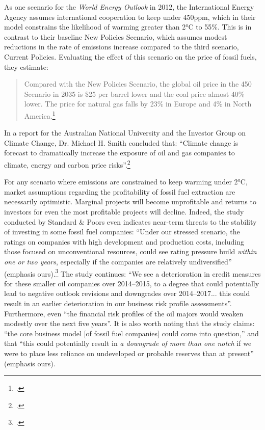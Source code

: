 As one scenario for the \emph{World Energy Outlook} in 2012, the International Energy Agency assumes international cooperation to keep  under 450ppm, which in their model constrains the likelihood of warming greater than 2°C to 55\%. 
This is in contrast to their baseline New Policies Scenario, which assumes modest reductions in the rate of emissions increase compared to the third scenario, Current Policies. 
Evaluating the effect of this scenario on the price of fossil fuels, they estimate:
\begin{quote}
Compared with the New Policies Scenario, the global oil price in the 450 Scenario in 2035 is \$25 per barrel lower and the coal price almost 40\% lower. The price for natural gas falls by 23\% in Europe and 4\% in North America.\footcite[][p. 257]{IEA2012}
\end{quote}
In a report for the Australian National University and the Investor Group on Climate Change, Dr. Michael H. Smith concluded that: ``Climate change is forecast to dramatically increase the exposure of oil and gas companies to climate, energy and carbon price risks''.\footcite[][p. 14]{RisksForInvestors}



For any scenario where emissions are constrained to keep warming under 2°C, market assumptions regarding the profitability of fossil fuel extraction are necessarily optimistic. 
Marginal projects will become unprofitable and returns to investors for even the most profitable projects will decline. 
Indeed, the study conducted by Standard \& Poors even indicates near-term threats to the stability of investing in some fossil fuel companies: ``Under our stressed scenario, the ratings on companies with high development and production costs, including those focused on unconventional resources, could see rating pressure build \emph{within one or two years}, especially if the companies are relatively undiversified'' (emphasis ours).\footcite{SandPConstrained}
The study continues: ``We see a deterioration in credit measures for these smaller oil companies over 2014--2015, to a degree that could potentially lead to negative outlook revisions and downgrades over 2014--2017... this could result in an earlier deterioration in our business risk profile assessments''.
Furthermore, even ``the financial risk profiles of the oil majors would weaken modestly over the next five years''.
It is also worth noting that the study claims: ``the core business model [of fossil fuel companies] could come into question,'' and that ``this could potentially result in \emph{a downgrade of more than one notch} if we were to place less reliance on undeveloped or probable reserves than at present'' (emphasis ours).



